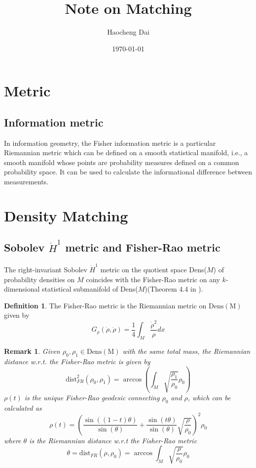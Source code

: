 \documentclass{article}
\title{Note on Matching}
\author{Haocheng Dai}
\date{\today}
\theoremstyle{definition}
\newtheorem{definition}{Definition}
\theoremstyle{plain}
\newtheorem{remark}{Remark}
\begin{document}
\maketitle

\section{Metric}
\subsection{Information metric}
In information geometry, the Fisher information metric is a particular Riemannian metric which can be defined on a smooth statistical manifold, i.e., a smooth manifold whose points are probability measures defined on a common probability space. It can be used to calculate the informational difference between measurements.

\section{Density Matching}
\subsection{Sobolev $\Dot H^1$ metric and Fisher-Rao metric}
The right-invariant Sobolev $\Dot H^1$ metric on the quotient space Dens($M$) of probability densities on $M$ coincides with the Fisher-Rao metric on any $k$-dimensional statistical submanifold of Dens($M$)(Theorem 4.4 in \cite{khesin}).

\begin{definition}
The Fisher-Rao metric is the Riemannian metric on $\mathrm{Dens(M)}$ given by
\begin{equation*}
    G_\rho(\Dot\rho,\Dot\rho)=\frac{1}{4}\int_M\frac{\Dot{\rho}^2}{\rho}dx
\end{equation*}
\end{definition}

\begin{remark}
Given $\rho_0,\rho_1\in\mathrm{Dens(M)}$ with the same total mass, the Riemannian distance w.r.t. the Fisher-Rao metric is given by
\begin{equation*}
    \mathrm{dist}^2_{FR}(\rho_0,\rho_1)=\arccos\left(\int_M\sqrt{\frac{\rho_1}{\rho_0}}\rho_0\right)
\end{equation*}
$\rho(t)$ is the unique Fisher-Rao geodesic connecting $\rho_0$ and $\rho$, which can be calculated as
\begin{equation*}
    \rho(t)=\left(\frac{\sin((1-t)\theta)}{\sin(\theta)}+\frac{\sin(t\theta)}{\sin(\theta)}\sqrt{\frac{\rho}{\rho_0}}\right)^2\rho_0
\end{equation*}
where $\theta$ is the Riemannian distance w.r.t the Fisher-Rao metric
\begin{equation*}
    \theta=\mathrm{dist}_{FR}(\rho,\rho_0)=\arccos\int_M\sqrt{\frac{\rho}{\rho_0}}\rho_0
\end{equation*}
\end{remark}
\end{document}
